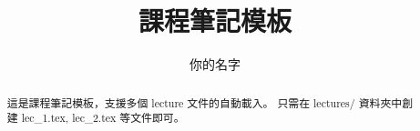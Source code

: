 \documentclass[a4paper]{report}
\author{你的名字}
\title{課程筆記模板}
\begin{document}
\maketitle

\begin{abstract}
	這是課程筆記模板，支援多個 lecture 文件的自動載入。
	只需在 lectures/ 資料夾中創建 lec\_1.tex, lec\_2.tex 等文件即可。
\end{abstract}

\newpage

\tableofcontents


\newpage

\appendix
\appendixpage{}



\newpage
\pagestyle{plain}
\printbibliography{}
\end{document}
